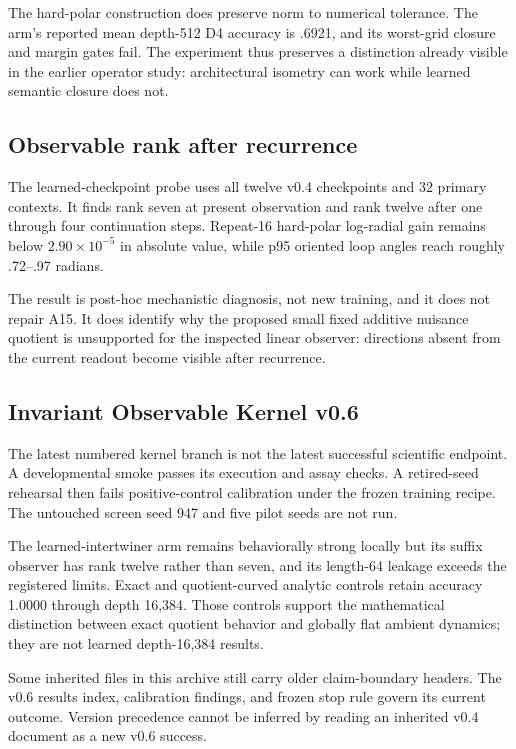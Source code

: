 \documentclass[11pt]{article}
\begin{document}
The hard-polar construction does preserve norm to numerical tolerance. The  arm's reported mean depth-512 D4 accuracy is .6921, and its worst-grid closure and margin gates fail. The experiment thus preserves a distinction already visible in the earlier operator study: architectural isometry can work while learned semantic closure does not.

\subsection{Observable rank after recurrence}
The learned-checkpoint probe uses all twelve v0.4 checkpoints and 32 primary contexts. It finds rank seven at present observation and rank twelve after one through four continuation steps. Repeat-16 hard-polar log-radial gain remains below \(2.90\times10^{-5}\) in absolute value, while p95 oriented loop angles reach roughly .72--.97 radians. \cite{nlp}

The result is post-hoc mechanistic diagnosis, not new training, and it does not repair A15. It does identify why the proposed small fixed additive nuisance quotient is unsupported for the inspected linear observer: directions absent from the current readout become visible after recurrence.

\subsection{Invariant Observable Kernel v0.6}
The latest numbered kernel branch is not the latest successful scientific endpoint. A developmental smoke passes its execution and assay checks. A retired-seed rehearsal then fails positive-control calibration under the frozen training recipe. The untouched screen seed 947 and five pilot seeds are not run. \cite{nik}

The learned-intertwiner arm remains behaviorally strong locally but its suffix observer has rank twelve rather than seven, and its length-64 leakage exceeds the registered limits. Exact and quotient-curved analytic controls retain accuracy 1.0000 through depth 16,384. Those controls support the mathematical distinction between exact quotient behavior and globally flat ambient dynamics; they are not learned depth-16,384 results.

Some inherited files in this archive still carry older claim-boundary headers. The v0.6 results index, calibration findings, and frozen stop rule govern its current outcome. Version precedence cannot be inferred by reading an inherited v0.4 document as a new v0.6 success.
\end{document}
